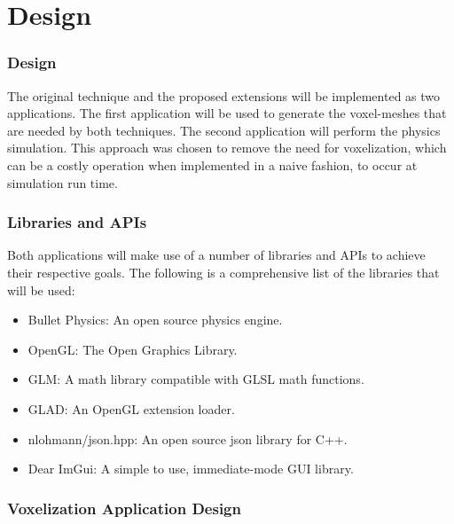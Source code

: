 \chapter{Design}


\subsection{Design}

The original technique and the proposed extensions will be implemented as two applications. The 
first application will be used to generate the voxel-meshes that are needed by both techniques. The
second application will perform the physics simulation. This approach was chosen to remove the need
for voxelization, which can be a costly operation when implemented in a naive fashion, to occur at
simulation run time.

\subsection{Libraries and APIs}

Both applications will make use of a number of libraries and APIs to achieve their respective goals. 
The following is a comprehensive list of the libraries that will be used:

\begin{itemize}
  \item Bullet Physics: An open source physics engine.
  \item OpenGL: The Open Graphics Library.
  \item GLM: A math library compatible with GLSL math functions.
  \item GLAD: An OpenGL extension loader.
  \item nlohmann/json.hpp: An open source json library for C++.
  \item Dear ImGui: A simple to use, immediate-mode GUI library.
\end{itemize}

\subsection{Voxelization Application Design}

